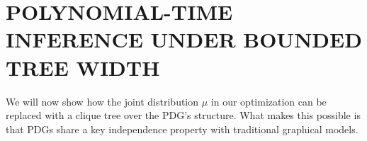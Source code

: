 \documentclass[twoside]{article}
\begin{document}
\section{POLYNOMIAL-TIME INFERENCE UNDER BOUNDED TREE WIDTH}
    \label{sec:clique-tree-expcone}

We will now show how the joint distribution $\mu$ in our optimization can be replaced
with a clique tree over the PDG's structure. What makes this possible is that
PDGs share a key independence property with traditional graphical models.
\end{document}
